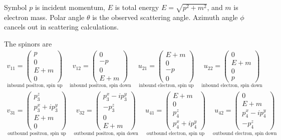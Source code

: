 \documentclass[12pt]{article}
\begin{document}
\noindent
Symbol $p$ is incident momentum,
$E$ is total energy $E=\sqrt{p^2+m^2}$,
and $m$ is electron mass.
Polar angle $\theta$ is the observed scattering angle.
Azimuth angle $\phi$ cancels out in scattering calculations.

\bigskip
\noindent
The spinors are
\begin{gather*}
\underset{\text{inbound positron, spin up}}
{v_{11}=\begin{pmatrix}p\\0\\E+m\\0\end{pmatrix}}
\quad
\underset{\text{inbound positron, spin down}}
{v_{12}=\begin{pmatrix}0\\-p\\0\\E+m\end{pmatrix}}
\quad
\underset{\text{inbound electron, spin up}}
{u_{21}=\begin{pmatrix}E+m\\0\\-p\\0\end{pmatrix}}
\quad
\underset{\text{inbound electron, spin down}}
{u_{22}=\begin{pmatrix}0\\E+m\\0\\p\end{pmatrix}}
\\
\underset{\text{outbound positron, spin up}}
{v_{31}=\begin{pmatrix}p_3^z\\p_3^x+ip_3^y\\E+m\\0\end{pmatrix}}
\quad
\underset{\text{outbound positron, spin down}}
{v_{32}=\begin{pmatrix}p_3^x-ip_3^y\\-p_3^z\\0\\E+m\end{pmatrix}}
\quad
\underset{\text{outbound electron, spin up}}
{u_{41}=\begin{pmatrix}E+m\\0\\p_4^z\\p_4^x+ip_4^y\end{pmatrix}}
\quad
\underset{\text{outbound electron, spin down}}
{u_{42}=\begin{pmatrix}0\\E+m\\p_4^x-ip_4^y\\-p_4^z\end{pmatrix}}
\end{gather*}
\end{document}
